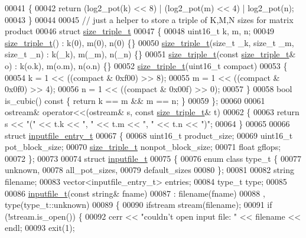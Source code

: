 \begin{DoxyCode}
00041 \{
00042   \textcolor{keywordflow}{return} (log2\_pot(k) << 8) | (log2\_pot(m) << 4) | log2\_pot(n);
00043 \}
00044 
00045 \textcolor{comment}{// just a helper to store a triple of K,M,N sizes for matrix product}
00046 \textcolor{keyword}{struct }\hyperlink{structsize__triple__t}{size\_triple\_t}
00047 \{
00048   uint16\_t k, m, n;
00049   \hyperlink{structsize__triple__t}{size\_triple\_t}() : k(0), m(0), n(0) \{\}
00050   \hyperlink{structsize__triple__t}{size\_triple\_t}(\textcolor{keywordtype}{size\_t} \_k, \textcolor{keywordtype}{size\_t} \_m, \textcolor{keywordtype}{size\_t} \_n) : k(\_k), m(\_m), n(\_n) \{\}
00051   \hyperlink{structsize__triple__t}{size\_triple\_t}(\textcolor{keyword}{const} \hyperlink{structsize__triple__t}{size\_triple\_t}& o) : k(o.k), m(o.m), n(o.n) \{\}
00052   \hyperlink{structsize__triple__t}{size\_triple\_t}(uint16\_t compact)
00053   \{
00054     k = 1 << ((compact & 0xf00) >> 8);
00055     m = 1 << ((compact & 0x0f0) >> 4);
00056     n = 1 << ((compact & 0x00f) >> 0);
00057   \}
00058   \textcolor{keywordtype}{bool} is\_cubic()\textcolor{keyword}{ const }\{ \textcolor{keywordflow}{return} k == m && m == n; \}
00059 \};
00060 
00061 ostream& operator<<(ostream& s, \textcolor{keyword}{const} \hyperlink{structsize__triple__t}{size\_triple\_t}& t)
00062 \{
00063   \textcolor{keywordflow}{return} s << \textcolor{stringliteral}{"("} << t.k << \textcolor{stringliteral}{", "} << t.m << \textcolor{stringliteral}{", "} << t.n << \textcolor{stringliteral}{")"};
00064 \}
00065 
00066 \textcolor{keyword}{struct }\hyperlink{structinputfile__entry__t}{inputfile\_entry\_t}
00067 \{
00068   uint16\_t product\_size;
00069   uint16\_t pot\_block\_size;
00070   \hyperlink{structsize__triple__t}{size\_triple\_t} nonpot\_block\_size;
00071   \textcolor{keywordtype}{float} gflops;
00072 \};
00073 
00074 \textcolor{keyword}{struct }\hyperlink{structinputfile__t}{inputfile\_t}
00075 \{
00076   \textcolor{keyword}{enum class} type\_t \{
00077     unknown,
00078     all\_pot\_sizes,
00079     default\_sizes
00080   \};
00081 
00082   \textcolor{keywordtype}{string} filename;
00083   vector<inputfile\_entry\_t> entries;
00084   type\_t type;
00085 
00086   \hyperlink{structinputfile__t}{inputfile\_t}(\textcolor{keyword}{const} \textcolor{keywordtype}{string}& fname)
00087     : filename(fname)
00088     , type(type\_t::unknown)
00089   \{
00090     ifstream stream(filename);
00091     \textcolor{keywordflow}{if} (!stream.is\_open()) \{
00092       cerr << \textcolor{stringliteral}{"couldn't open input file: "} << filename << endl;
00093       exit(1);

\end{DoxyCode}
